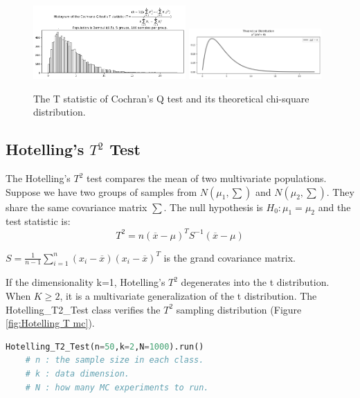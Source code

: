 \documentclass[11pt, letterpaper]{article}
\begin{document}
\begin{figure}[htbp]
    \centering
    \vspace{-0.5em}

    \includegraphics[width=0.52\textwidth]{fig15-Cochran Q mc1.png}
    \includegraphics[width=0.45\textwidth]{fig15-Cochran Q mc2.png}
    \caption{The T statistic of Cochran's Q test and its theoretical chi-square distribution.}
    \label{fig:Cochran Q mc}
\end{figure}

\subsection{Hotelling's $T^2$ Test}
The Hotelling's $T^2$ test compares the mean of two multivariate populations.
Suppose we have two groups of samples from $N(\mu_{1},\sum)$ and $N(\mu_{2},\sum)$.
They share the same covariance matrix $\sum$. The null hypothesis is $H_{0}: \mu_{1}=\mu_{2}$
and the test statistic is:
\begin{equation}
    \label{deqn_ex14}
    T^2=n(\overline{x}-\mu)^{T}S^{-1}(\overline{x}-\mu)
\end{equation}

\noindent $S=\frac{1}{n-1}\sum_{i=1}^{n}(x_{i}-\overline{x})(x_{i}-\overline{x})^T$  is the grand covariance matrix.

If the dimensionality k=1, Hotelling's $T^2$ degenerates into the t distribution.
When $K \geq 2$, it is a multivariate generalization of the t distribution. The Hotelling\_T2\_Test
class verifies the $T^2$ sampling distribution (Figure \ref{fig:Hotelling T mc}).

\lstset{
    basicstyle=\footnotesize,
    xleftmargin=-1em,aboveskip=0.5em,belowskip=0.5em
}
\begin{lstlisting}[language=python]
    Hotelling_T2_Test(n=50,k=2,N=1000).run()
    # n : the sample size in each class.
    # k : data dimension.
    # N : how many MC experiments to run.
    \end{lstlisting}
\end{document}

